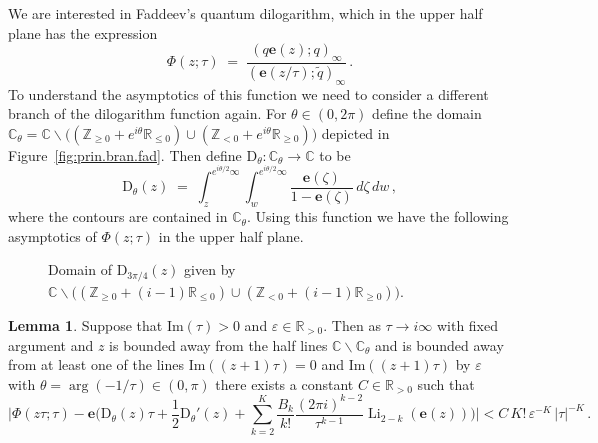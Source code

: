 \documentclass[12pt,reqno]{amsart}
\theoremstyle{definition}
\newtheorem{lemma}[theorem]{Lemma}
\def\BZ{\mathbb Z}
\def\BR{\mathbb R}
\def\BC{\mathbb C}
\def\Im{\mathrm{Im}}
\def\be{\begin{equation}}
\def\ee{\end{equation}}
\def\z{\zeta}
\def\e{\mathbf e}
\renewcommand{\=}{\;=\;}
\newcommand{\tq}{\widetilde q}
\newcommand{\Li}{\operatorname{Li}}
\begin{document}
We are interested in Faddeev's quantum dilogarithm, which in the upper half plane has the expression
\be
  \Phi(z;\tau)
  \=
  \frac{(q\e(z);q)_{\infty}}{(\e(z/\tau);\tq)_{\infty}}\,.
\ee
To understand the asymptotics of this function we need to consider a different branch of the dilogarithm function again. For $\theta\in(0,2\pi)$ define the domain $\BC_{\theta}=\BC\backslash\big((\BZ_{\geq0}+e^{i\theta}\BR_{\leq0})\cup(\BZ_{<0}+e^{i\theta}\BR_{\geq0})\big)$ depicted in Figure~\ref{fig:prin.bran.fad}. Then define $\mathrm{D}_{\theta}:\BC_{\theta}\rightarrow\BC$ to be
\be
  \mathrm{D}_{\theta}(z)
  \=
  \int_{z}^{e^{i\theta/2}\infty}
  \int_{w}^{e^{i\theta/2}\infty}
  \frac{\e(\z)}{1-\e(\z)}\,d\z\,dw\,,
\ee
where the contours are contained in $\BC_{\theta}$. Using this function we have the following asymptotics of $\Phi(z;\tau)$ in the upper half plane.
\begin{center}
\begin{figure}
\caption{Domain of $\mathrm{D}_{3\pi/4}(z)$ given by $\BC\backslash\big((\BZ_{\geq0}+(i-1)\BR_{\leq0})\cup(\BZ_{<0}+(i-1)\BR_{\geq0})\big)$.}
\label{fig:prin.bran.fad.2}
\end{figure}
\end{center}
\begin{lemma}\label{lem:asymp.qpoch.2}
Suppose that $\Im(\tau)>0$ and $\varepsilon\in\BR_{>0}$. Then as $\tau\rightarrow i\infty$ with fixed argument and $z$ is bounded away from the half lines $\BC\backslash\BC_{\theta}$ and is bounded away from at least one of the lines $\Im((z+1)\tau)=0$ and $\Im((z+1)\tau)$ by $\varepsilon$ with $\theta=\arg(-1/\tau)\in(0,\pi)$ there exists a constant $C\in\BR_{>0}$ such that
\be
    \Big|\Phi(z\tau;\tau)
    -
    \e\Big(\mathrm{D}_{\theta}(z)\tau
    +
    \frac{1}{2}\mathrm{D}_{\theta}'(z)
    +
    \sum_{k=2}^{K}\frac{B_k}{k!}\frac{(2\pi i)^{k-2}}{\tau^{k-1}}\Li_{2-k}(\e(z))\Big)
    \Big|
    <
    C\,K!\, \varepsilon^{-K}\,|\tau|^{-K}\,.
\ee
\end{lemma}
\end{document}
